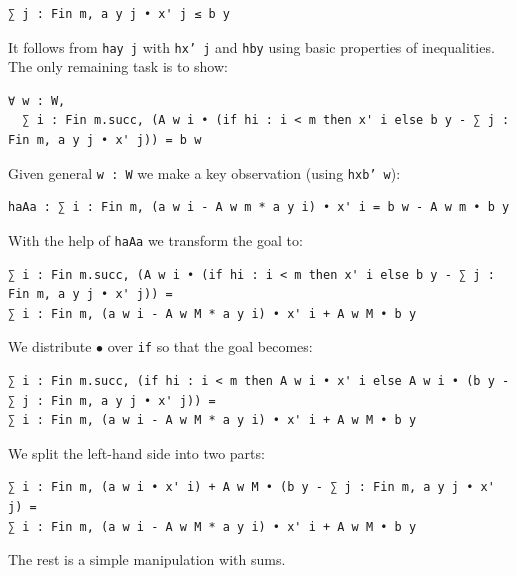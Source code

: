 \documentclass[]{article}
\renewcommand{\.}{\hskip .75pt}
\begin{document}
\begin{lstlisting}
∑ j : Fin m, a y j • x' j ≤ b y
\end{lstlisting}
It follows from \texttt{hay j} with \texttt{hx' j} and \texttt{hby} using basic properties of inequalities.
The only remaining task is to show:
\begin{lstlisting}
∀ w : W, 
  ∑ i : Fin m.succ, (A w i • (if hi : i < m then x' i else b y - ∑ j : Fin m, a y j • x' j)) = b w
\end{lstlisting}
Given general \texttt{w :~W} we make a key observation (using \texttt{hxb' w}):
\begin{lstlisting}
haAa : ∑ i : Fin m, (a w i - A w m * a y i) • x' i = b w - A w m • b y
\end{lstlisting}
With the help of \texttt{haAa} we transform the goal to:
\begin{lstlisting}
∑ i : Fin m.succ, (A w i • (if hi : i < m then x' i else b y - ∑ j : Fin m, a y j • x' j)) =
∑ i : Fin m, (a w i - A w M * a y i) • x' i + A w M • b y
\end{lstlisting}
We distribute $\bullet$ over \texttt{if} so that the goal becomes:
\begin{lstlisting}
∑ i : Fin m.succ, (if hi : i < m then A w i • x' i else A w i • (b y - ∑ j : Fin m, a y j • x' j)) =
∑ i : Fin m, (a w i - A w M * a y i) • x' i + A w M • b y
\end{lstlisting}
We split the left-hand side into two parts:
\begin{lstlisting}
∑ i : Fin m, (a w i • x' i) + A w M • (b y - ∑ j : Fin m, a y j • x' j) =
∑ i : Fin m, (a w i - A w M * a y i) • x' i + A w M • b y
\end{lstlisting}
The rest is a simple manipulation with sums.
\end{document}
